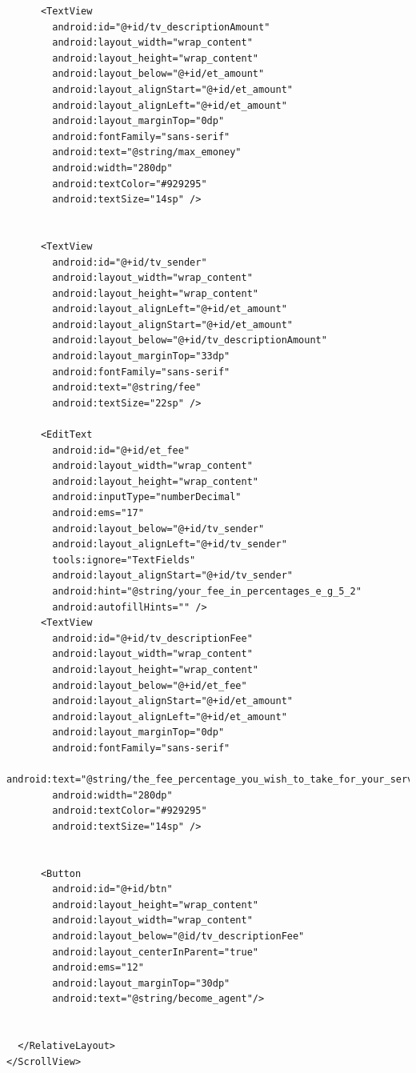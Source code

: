 \documentclass[11pt, a4paper]{article}
\begin{document}
\begin{appendices}
\begin{lstlisting}
      <TextView
        android:id="@+id/tv_descriptionAmount"
        android:layout_width="wrap_content"
        android:layout_height="wrap_content"
        android:layout_below="@+id/et_amount"
        android:layout_alignStart="@+id/et_amount"
        android:layout_alignLeft="@+id/et_amount"
        android:layout_marginTop="0dp"
        android:fontFamily="sans-serif"
        android:text="@string/max_emoney"
        android:width="280dp"
        android:textColor="#929295"
        android:textSize="14sp" />


      <TextView
        android:id="@+id/tv_sender"
        android:layout_width="wrap_content"
        android:layout_height="wrap_content"
        android:layout_alignLeft="@+id/et_amount"
        android:layout_alignStart="@+id/et_amount"
        android:layout_below="@+id/tv_descriptionAmount"
        android:layout_marginTop="33dp"
        android:fontFamily="sans-serif"
        android:text="@string/fee"
        android:textSize="22sp" />

      <EditText
        android:id="@+id/et_fee"
        android:layout_width="wrap_content"
        android:layout_height="wrap_content"
        android:inputType="numberDecimal"
        android:ems="17"
        android:layout_below="@+id/tv_sender"
        android:layout_alignLeft="@+id/tv_sender"
        tools:ignore="TextFields"
        android:layout_alignStart="@+id/tv_sender"
        android:hint="@string/your_fee_in_percentages_e_g_5_2"
        android:autofillHints="" />
      <TextView
        android:id="@+id/tv_descriptionFee"
        android:layout_width="wrap_content"
        android:layout_height="wrap_content"
        android:layout_below="@+id/et_fee"
        android:layout_alignStart="@+id/et_amount"
        android:layout_alignLeft="@+id/et_amount"
        android:layout_marginTop="0dp"
        android:fontFamily="sans-serif"
        android:text="@string/the_fee_percentage_you_wish_to_take_for_your_service"
        android:width="280dp"
        android:textColor="#929295"
        android:textSize="14sp" />


      <Button
        android:id="@+id/btn"
        android:layout_height="wrap_content"
        android:layout_width="wrap_content"
        android:layout_below="@id/tv_descriptionFee"
        android:layout_centerInParent="true"
        android:ems="12"
        android:layout_marginTop="30dp"
        android:text="@string/become_agent"/>


  </RelativeLayout>
</ScrollView>
\end{lstlisting}

\end{appendices}
\end{document}

